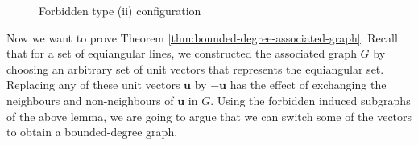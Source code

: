 \begin{figure}[ht]
    \centering
    
    \captionsetup{justification=centering, margin=2cm}
    \caption{Forbidden type (ii) configuration}
    \label{fig:forbidden-typeii-config}
\end{figure}

Now we want to prove Theorem \ref{thm:bounded-degree-associated-graph}.
Recall that for a set of equiangular lines, we constructed the associated graph $G$ by choosing an arbitrary set of unit vectors that represents the equiangular set.
Replacing any of these unit vectors $\bm{u}$ by $-\bm{u}$ has the effect of exchanging the neighbours and non-neighbours of $\bm{u}$ in $G$. 
Using the forbidden induced subgraphs of the above lemma, we are going to argue that we can switch some of the vectors to obtain a bounded-degree graph.

